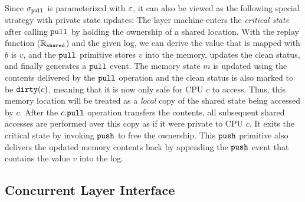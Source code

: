 Since $\sigma_{\mathrm{\texttt{pull}}}$ is parameterized with ${\varepsilon}$, it can also be viewed as the following special strategy  with private state updates:%
%
The layer machine enters the \emph{critical state} after calling ${\mathrm{\texttt{pull}}}$ by holding the ownership
of a shared location.
With the replay function ($\mathbb{R}_{{\mathrm{\texttt{shared}}}}$) and the given log, 
we can derive the value that is mapped with $b$ is $v$, 
and the ${\mathrm{\texttt{pull}}}$ primitive
stores  $v$  into the memory, updates the clean status,
and finally generates a ${\mathrm{\texttt{pull}}}$ event.
The memory state $m$ is updated using the contents delivered
by the ${\mathrm{\texttt{pull}}}$ operation
and  the clean status is also marked to be ${\mathrm{\texttt{dirty}}}(c)$,
meaning that it is now only safe for CPU $c$ to access.
Thus, this memory location will be treated as
a \emph{local}
copy of the shared state being accessed by $c$.
After the $c.{\mathrm{\texttt{pull}}}$ operation transfers the contents,
all subsequent shared accesses are performed over this 
copy as if it were private to CPU $c$.
It exits the critical state by invoking ${\mathrm{\texttt{push}}}$ to free the ownership.
This ${\mathrm{\texttt{push}}}$ primitive also delivers the updated memory contents back 
by appending the ${\mathrm{\texttt{push}}}$ event that contains the value $v$ into the log.












\subsection{Concurrent Layer Interface}
\label{capther:ccal:sec:concurrent-layer-interface}

